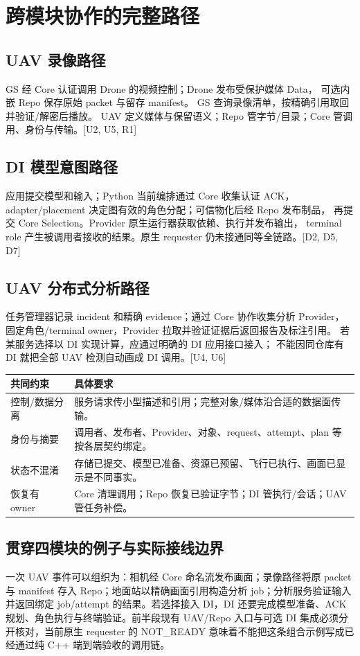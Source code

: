 \newpage

\section{跨模块协作的完整路径}
\subsection{UAV 录像路径}
GS 经 Core 认证调用 Drone 的视频控制；Drone 发布受保护媒体 Data，
可选内嵌 Repo 保存原始 packet 与留存 manifest。
GS 查询录像清单，按精确引用取回并验证/解密后播放。
UAV 定义媒体与保留语义；Repo 管字节/目录；Core 管调用、身份与传输。[U2, U5, R1]

\subsection{DI 模型意图路径}
应用提交模型和输入；Python 当前编排通过 Core 收集认证 ACK，
adapter/placement 决定图有效的角色分配；可信物化后经 Repo 发布制品，
再提交 Core Selection。Provider 原生运行器获取依赖、执行并发布输出，
terminal role 产生被调用者接收的结果。原生 requester 仍未接通同等全链路。[D2, D5, D7]

\subsection{UAV 分布式分析路径}
任务管理器记录 incident 和精确 evidence；通过 Core 协作收集分析 Provider，
固定角色/terminal owner，Provider 拉取并验证证据后返回报告及标注引用。
若某服务选择以 DI 实现计算，应通过明确的 DI 应用接口接入；
不能因同仓库有 DI 就把全部 UAV 检测自动画成 DI 调用。[U4, U6]

\begin{tabularx}{\linewidth}{@{}p{34mm}X@{}}
\toprule
共同约束 & 具体要求 \\
\midrule
控制/数据分离 & 服务请求传小型描述和引用；完整对象/媒体沿合适的数据面传输。\\
身份与摘要 & 调用者、发布者、Provider、对象、request、attempt、plan 等按各层契约绑定。\\
状态不混淆 & 存储已提交、模型已准备、资源已预留、飞行已执行、画面已显示是不同事实。\\
恢复有 owner & Core 清理调用；Repo 恢复已验证字节；DI 管执行/会话；UAV 管任务补偿。\\
\bottomrule
\end{tabularx}


\subsection{贯穿四模块的例子与实际接线边界}
一次 UAV 事件可以组织为：相机经 Core 命名流发布画面；录像路径将原 packet 与 manifest 存入 Repo；地面站以精确画面引用构造分析 job；分析服务验证输入并返回绑定 job/attempt 的结果。若选择接入 DI，DI 还要完成模型准备、ACK 规划、角色执行与终端验证。前半段现有 UAV/Repo 入口与可选 DI 集成必须分开核对，当前原生 requester 的 NOT\_READY 意味着不能把这条组合示例写成已经通过纯 C++ 端到端验收的调用链。

